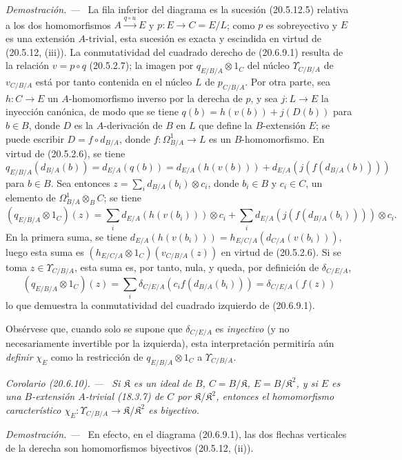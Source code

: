 \documentclass[10pt,oneside]{book}
\makeatletter
\newcommand{\setmanualcurrentlabel}[1]{\def\@currentlabel{#1}}
\newcommand{\oldpage}[2][]{%
  \setcounter{footnote}{0}%
  \marginpar{\scriptsize\textbf{#1}~|~#2}\ignorespaces}
\newenvironment{corollary}[1][]{%
  \setmanualcurrentlabel{#1}\par\medskip\noindent\itshape Corolario (#1). ---\ }{\par}
\newenvironment{proof}{%
  \par\medskip\noindent\textit{Demostración. ---\ }}{\par}
\makeatother
\begin{document}
\begin{proof}
La fila inferior del diagrama es la sucesión (20.5.12.5) relativa a los
dos homomorfismos $A\xrightarrow{q\circ u}E$ y
$p:E\to C=E/L$; como $p$ es sobreyectivo y $E$ es una extensión
$A$-trivial, esta sucesión es exacta y escindida en virtud de (20.5.12,
(iii)). La conmutatividad del cuadrado derecho de (20.6.9.1) resulta de la
relación $v=p\circ q$ (20.5.2.7); la imagen por
$q_{E/B/A}\otimes1_C$ del núcleo $\Upsilon_{C/B/A}$ de $v_{C/B/A}$ está
por tanto contenida en el núcleo $L$ de $p_{C/B/A}$. Por otra parte, sea
$h:C\to E$ un $A$-homomorfismo inverso por la derecha de $p$, y sea
$j:L\to E$ la inyección canónica, de modo que se tiene
$q(b)=h(v(b))+j(D(b))$ para $b\in B$, donde $D$ es la $A$-derivación de
$B$ en $L$ que define la $B$-extensión $E$; se puede escribir
$D=f\circ d_{B/A}$, donde $f:\Omega^1_{B/A}\to L$ es un
$B$-homomorfismo. En virtud de (20.5.2.6), se tiene
\[
  q_{E/B/A}(d_{B/A}(b))=d_{E/A}(q(b))
  =d_{E/A}(h(v(b)))+d_{E/A}(j(f(d_{B/A}(b))))
\]
para $b\in B$. Sea entonces
$z=\sum_i d_{B/A}(b_i)\otimes c_i$, donde $b_i\in B$ y $c_i\in C$, un
elemento de $\Omega^1_{B/A}\otimes_B C$; se tiene
\[
  (q_{E/B/A}\otimes1_C)(z)=
  \sum_i d_{E/A}(h(v(b_i)))\otimes c_i+
  \sum_i d_{E/A}(j(f(d_{B/A}(b_i))))\otimes c_i.
\]
En la primera suma, se tiene
$d_{E/A}(h(v(b_i)))=h_{E/C/A}(d_{C/A}(v(b_i)))$, luego esta suma es
$(h_{E/C/A}\otimes1_C)(v_{C/B/A}(z))$ en virtud de (20.5.2.6). Si se
toma $z\in\Upsilon_{C/B/A}$, esta suma es, por tanto, nula, y queda,
por definición de $\delta_{C/E/A}$,
\[
  (q_{E/B/A}\otimes1_C)(z)=
  \sum_i\delta_{C/E/A}(c_i f(d_{B/A}(b_i)))
  =\delta_{C/E/A}(f(z))
\]
lo que demuestra la conmutatividad del cuadrado izquierdo de (20.6.9.1).
\end{proof}

Obsérvese que, cuando solo se supone que $\delta_{C/E/A}$ es
\emph{inyectivo} (y no necesariamente invertible por la izquierda), esta
interpretación permitiría aún \emph{definir} $\chi_E$ como la
restricción de $q_{E/B/A}\otimes1_C$ a $\Upsilon_{C/B/A}$.

\begin{corollary}[20.6.10]
\label{0.20.6.10-es}
Si $\mathfrak K$ es un ideal de $B$, $C=B/\mathfrak K$,
$E=B/\mathfrak K^2$, y si $E$ es una $B$-extensión $A$-trivial
\textup{(18.3.7)} de $C$ por $\mathfrak K/\mathfrak K^2$, entonces
el homomorfismo característico
$\chi_E:\Upsilon_{C/B/A}\to\mathfrak K/\mathfrak K^2$ es biyectivo.
\end{corollary}
\begin{proof}
\oldpage[0\textsubscript{IV-1}]{140}
En efecto, en el diagrama (20.6.9.1), las dos flechas verticales de la
derecha son homomorfismos biyectivos (20.5.12, (ii)).
\end{proof}
\end{document}
